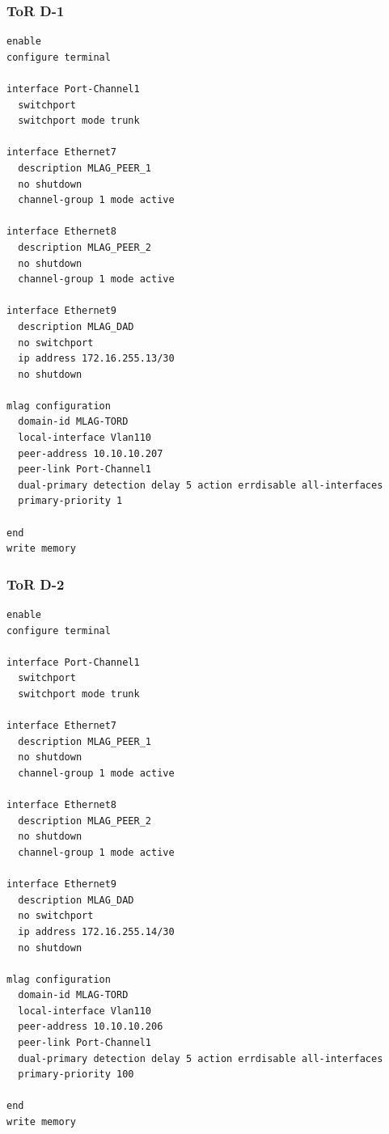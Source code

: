 \subsubsection{ToR D-1}
\begin{lstlisting}[caption={ToR D-1: MLAG peer-link and domain configuration.},basicstyle=\ttfamily\footnotesize,breaklines=true]
enable
configure terminal

interface Port-Channel1
  switchport
  switchport mode trunk

interface Ethernet7
  description MLAG_PEER_1
  no shutdown
  channel-group 1 mode active

interface Ethernet8
  description MLAG_PEER_2
  no shutdown
  channel-group 1 mode active

interface Ethernet9
  description MLAG_DAD
  no switchport
  ip address 172.16.255.13/30
  no shutdown

mlag configuration
  domain-id MLAG-TORD
  local-interface Vlan110
  peer-address 10.10.10.207
  peer-link Port-Channel1
  dual-primary detection delay 5 action errdisable all-interfaces
  primary-priority 1

end
write memory
\end{lstlisting}

\subsubsection{ToR D-2}
\begin{lstlisting}[caption={ToR D-2: MLAG peer-link and domain configuration.},basicstyle=\ttfamily\footnotesize,breaklines=true]
enable
configure terminal

interface Port-Channel1
  switchport
  switchport mode trunk

interface Ethernet7
  description MLAG_PEER_1
  no shutdown
  channel-group 1 mode active

interface Ethernet8
  description MLAG_PEER_2
  no shutdown
  channel-group 1 mode active

interface Ethernet9
  description MLAG_DAD
  no switchport
  ip address 172.16.255.14/30
  no shutdown

mlag configuration
  domain-id MLAG-TORD
  local-interface Vlan110
  peer-address 10.10.10.206
  peer-link Port-Channel1
  dual-primary detection delay 5 action errdisable all-interfaces
  primary-priority 100

end
write memory
\end{lstlisting}
